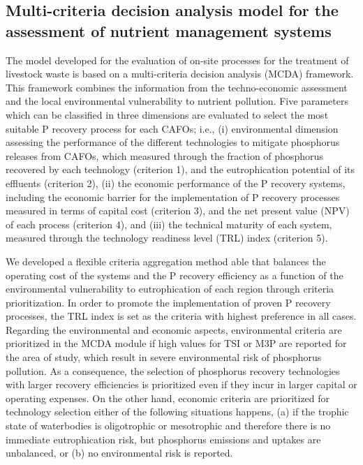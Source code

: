 \begin{refsection}[referencesCh5]
\subsection{Multi-criteria decision analysis model for the assessment of nutrient management systems}
The model developed for the evaluation of on-site processes for the treatment of livestock waste is based on a multi-criteria decision analysis (MCDA) framework. This framework combines the information from the techno-economic assessment and the local environmental vulnerability to nutrient pollution. Five parameters which can be classified in three dimensions are evaluated to select the most suitable P recovery process for each CAFOs; i.e.,  (i) environmental dimension assessing the performance of the different technologies to mitigate phosphorus releases from CAFOs, which measured through the fraction of phosphorus recovered by each technology (criterion 1), and the eutrophication potential of its effluents (criterion 2), (ii) the economic performance of the P recovery systems, including the economic barrier for the implementation of P recovery processes measured in terms of capital cost (criterion 3), and the net present value (NPV) of each process (criterion 4), and (iii) the technical maturity of each system, measured through the technology readiness level (TRL) index (criterion 5).

We developed a flexible criteria aggregation method able that balances the operating cost of the systems and the P recovery efficiency as a function of the environmental vulnerability to eutrophication of each region through criteria prioritization. In order to promote the implementation of proven P recovery processes, the TRL index is set as the criteria with highest preference in all cases. Regarding the environmental and economic aspects, environmental criteria are prioritized in the MCDA module if high values for TSI or M3P are reported for the area of study, which result in severe environmental risk of phosphorus pollution. As a consequence, the selection of phosphorus recovery technologies with larger recovery efficiencies is prioritized even if they incur in larger capital or operating expenses. On the other hand, economic criteria are prioritized for technology selection either of the following situations happens, (a) if the trophic state of waterbodies is oligotrophic or mesotrophic and therefore there is no immediate eutrophication risk, but phosphorus emissions and uptakes are unbalanced, or (b) no environmental risk is reported.


\end{refsection}
